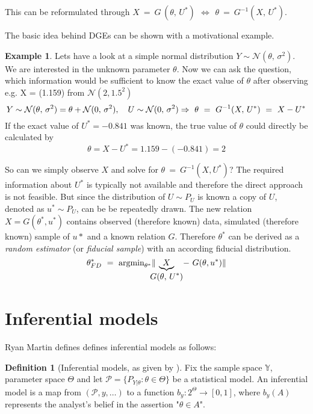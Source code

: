 \documentclass[
]{report}
\theoremstyle{definition}
\newtheorem{definition}{Definition}[section]
\newtheorem{example}{Example}[section]
\begin{document}
This can be reformulated through
\(X \ = \ G \, (\theta, \, U^*) \ \, \Leftrightarrow \ \, \theta \ = \ G^{-1}(X, \, U^*)\).

The basic idea behind DGEs can be shown with a motivational example.

\begin{example}
Lets have a look at a simple normal distribution $Y \sim \mathcal{N}(\theta,\, \sigma^2)$. We are interested in the unknown parameter $\theta$. Now we can ask the question, which information would be sufficient to know the exact value of $\theta$ after observing e.g. X = (1.159) from $\mathcal{N}(2, 1.5^2)$
$$Y \sim \mathcal{N}(\theta,\, \sigma^2) = \theta + \mathcal{N}(0,\, \sigma^2), \quad U \sim \mathcal{N}(0,\, \sigma^2) \newline
\Rightarrow \ \theta \ = \ G^{-1}(X, \, U^*) \ = \ X - U^*$$
If the exact value of $U^* = -0.841$ was known, the true value of $\theta$ could directly be calculated by
$$\theta = X- U^* = 1.159 - (-0.841) = 2$$
\end{example}

So can we simply observe \(X\) and solve for
\(\theta \ = \ G^{-1}(X, U^*)\)? The required information about \(U^*\)
is typically not available and therefore the direct approach is not
feasible. But since the distribution of \(U \sim P_{U}\) is known a copy
of \(U\), denoted as \(u^* \sim P_U\), can be be repeatedly drawn. The
new relation \(X = G(\theta^*, u^*)\) contains observed (therefore
known) data, simulated (therefore known) sample of \(u*\) and a known
relation \(G\). Therefore \(\theta^*\) can be derived as a
\textit{random estimator} (or \textit{fiducial sample}) with an
according fiducial distribution.
\[\theta^*_{FD} \ = \ \text{argmin}_{\theta^*} \| \hspace{-0.3cm} \underbrace{X}_{\displaystyle{G(\theta, \, U^*)}} \! - \ G(\theta, u^*) \| \]

\section{Inferential models}

Ryan Martin defines defines inferential models as follows:

\begin{definition}[Inferential models, as given by \cite{martin_false_2019}]
Fix the sample space $\mathbb{Y}$, parameter space $\Theta$ and let $\mathscr{P} = \{P_{Y|\theta} : \theta \in \Theta\}$ be a statistical model. An inferential model is a map from $(\mathscr{P}, y, \dots)$ to a function 
$b_y : 2^{\Theta} \to [0,1]$, where $b_y(A)$ represents the analyst's belief 
in the assertion "$\theta \in A$".
\end{definition}
\end{document}
